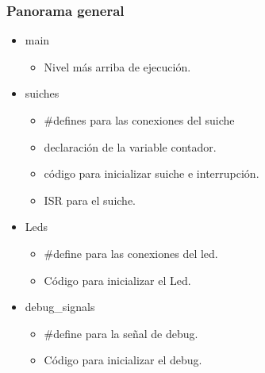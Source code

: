 \documentclass[10.5pt,scale=1.0,t,aspectratio=169,hyperref={pdfpagelabels=false}]{beamer}
\begin{document}
\begin{frame}
	\frametitle{Panorama general}
	\begin{itemize}
		\item main
		\begin{itemize}
			\item Nivel más arriba de ejecución.
		\end{itemize}
		\item suiches
		\begin{itemize}
			\item \#defines para las conexiones del suiche
			\item declaración de la variable contador.
			\item código para inicializar suiche e interrupción.
			\item ISR para el suiche.
		\end{itemize}
		\item Leds
		\begin{itemize}
			\item \#define para las conexiones del led.
			\item Código para inicializar el Led.
		\end{itemize}
		\item debug\_signals
		\begin{itemize}
			\item \#define para la señal de debug.
			\item Código para inicializar el debug.
		\end{itemize}
	\end{itemize}
\end{frame}
\end{document}
